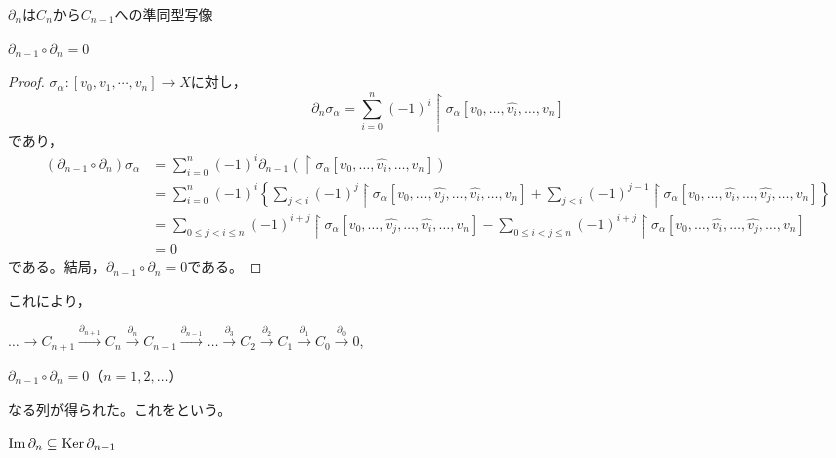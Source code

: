 \documentclass[uplatex]{jsarticle}
\begin{document}
\begin{prop}
  $\partial_{n}$は$C_{n}$から$C_{n-1}$への準同型写像
\end{prop}

\begin{hodai}
  $\partial_{n-1} \circ \partial_{n} = 0$
\end{hodai}

\begin{proof}
  $\sigma_{\alpha} \colon [v_{0},v_{1},\cdots, v_{n}] \longrightarrow X$に対し，
  \begin{equation}
    \partial_{n} \sigma_{\alpha} = \sum_{i=0}^{n} (-1)^{i} \restriction{\sigma_{\alpha}}{[v_{0},\dots,\hat{v_{i}},\dots,v_{n}]}
  \end{equation}
  であり，
  \begin{align}
    (\partial_{n-1}\circ \partial_{n})\sigma_{\alpha} &=
    \sum_{i=0}^{n} (-1)^{i} \partial_{n-1} \left( \restriction{\sigma_{\alpha}}{[v_{0},\dots,\hat{v_{i}},\dots,v_{n}]} \right) \\
    &= \sum_{i=0}^{n} (-1)^{i}
    \left\{ \sum_{j<i} (-1)^{j} \restriction{\sigma_{\alpha}}{[v_{0},\dots,\hat{v_{j}},\dots,\hat{v_{i}},\dots,v_{n}]} + \sum_{j<i} (-1)^{j-1} \restriction{\sigma_{\alpha}}{[v_{0},\dots,\hat{v_{i}},\dots,\hat{v_{j}},\dots,v_{n}]} \right\} \\
    &= \sum_{0 \le j < i \le n} (-1)^{i+j} \restriction{\sigma_{\alpha}}{[v_{0},\dots,\hat{v_{j}},\dots,\hat{v_{i}},\dots,v_{n}]} - \sum_{0 \le i < j \le n} (-1)^{i+j} \restriction{\sigma_{\alpha}}{[v_{0},\dots,\hat{v_{i}},\dots,\hat{v_{j}},\dots,v_{n}]} \\
    &= 0
  \end{align}
  である。結局，$\partial_{n-1} \circ \partial_{n} = 0$である。
\end{proof}

これにより，
\begin{center}
  $\dots \to C_{n+1} \xrightarrow{\partial_{n+1}} C_{n} \xrightarrow{\partial_{n}} C_{n-1} \xrightarrow{\partial_{n-1}} \dots \xrightarrow{\partial_{3}} C_{2} \xrightarrow{\partial_{2}} C_{1} \xrightarrow{\partial_{1}} C_{0} \xrightarrow{\partial_{0}} 0$,

  $\partial_{n-1} \circ \partial_{n} = 0$（$n=1,2,\dots$）
\end{center}
なる列が得られた。これをという。

\begin{prop}
  $\operatorname{Im} \partial_{n} \subseteq \operatorname{Ker} \partial_{n-1}$
\end{prop}
\end{document}
